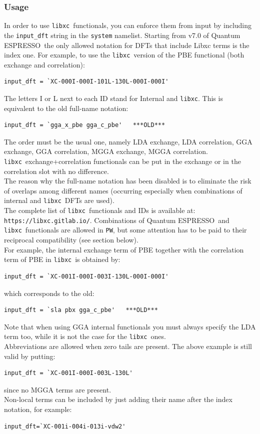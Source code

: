 \documentclass[12pt,a4paper]{article}
\def\qe{{\sc Quantum ESPRESSO}}
\def\libxc{\texttt{libxc}}
\begin{document}
\subsubsection{Usage}
In order to use \libxc\ functionals, you can enforce them from input by including the \texttt{input\_dft} string in the \texttt{system} namelist. Starting from v7.0 of \qe\ the only allowed notation for DFTs that include Libxc terms is the index one. For example, to use the \libxc\ version of the PBE functional (both exchange and correlation):
\begin{verbatim}
input_dft = `XC-000I-000I-101L-130L-000I-000I'
\end{verbatim}
The letters I or L next to each ID stand for Internal and \libxc. This is equivalent to the old full-name notation:
\begin{verbatim}
input_dft = `gga_x_pbe gga_c_pbe'   ***OLD***
\end{verbatim}
The order must be the usual one, namely LDA exchange, LDA correlation, GGA exchange, GGA correlation, MGGA exchange, MGGA correlation. \libxc\ exchange+correlation functionals can be put in the exchange or in the correlation slot with no difference.\\
The reason why the full-name notation has been disabled is to eliminate the risk of overlaps among different names (occurring especially when combinations of internal and \libxc\ DFTs are used).\\
%
The complete list of \libxc\ functionals and IDs is available at:
\verb|https://libxc.gitlab.io/|.
%
Combinations of \qe\ and \libxc\ functionals are allowed in \texttt{PW}, but some attention has to be paid to their reciprocal compatibility (see section below).\\
For example, the internal exchange term of PBE together with the correlation term of PBE in \libxc\ is obtained by:
\begin{verbatim}
input_dft = `XC-001I-000I-003I-130L-000I-000I'
\end{verbatim}
which corresponds to the old:
\begin{verbatim}
input_dft = `sla pbx gga_c_pbe'   ***OLD***
\end{verbatim}
Note that when using GGA internal functionals you must always specify the LDA term too, while it is not the case for the \libxc\ ones.\\
Abbreviations are allowed when zero tails are present. The above example is still valid by putting:
\begin{verbatim}
input_dft = `XC-001I-000I-003L-130L'
\end{verbatim}
since no MGGA terms are present.\\
Non-local terms can be included by just adding their name after the index notation, for example:
\begin{verbatim}
input_dft=`XC-001i-004i-013i-vdw2'
\end{verbatim}
%
\end{document}
